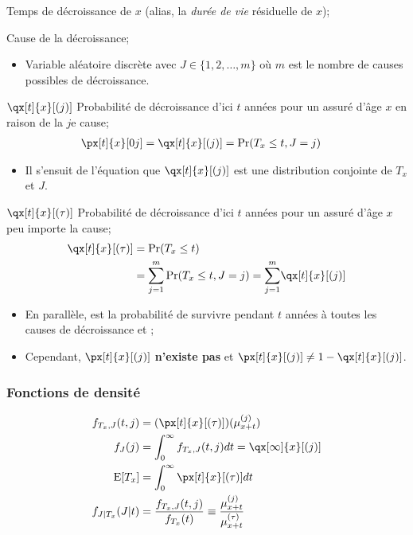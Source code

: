 \documentclass[10pt, french]{article}
\begin{document}
\begin{multicols*}{2}
\begin{description}
	\item[$T_{x}$]	Temps de décroissance de $x$ (alias, la \textit{durée de vie} résiduelle de $x$);
	\item[$J$]	Cause de la décroissance;
		\begin{itemize}[leftmargin = *]
		\item	Variable aléatoire discrète avec $J \in \{1, 2, \dots, m\}$ où $m$ est le nombre de causes possibles de décroissance.
		\end{itemize}
	\item	$\qx[t]{x}[(j)]$	Probabilité de décroissance d'ici $t$ années pour un assuré d'âge $x$ en raison de la $j$e cause;
		\begin{align*}
		\px[t]{x}[0j]
		&=	\qx[t]{x}[(j)]
		=	\Pr(T_{x} \leq t, J = j)
		\end{align*}
		\begin{itemize}[leftmargin = *]
		\item	Il s'ensuit de l'équation que $\qx[t]{x}[(j)]$ est une distribution conjointe de $T_{x}$ et $J$.
		\end{itemize}
	\item	$\qx[t]{x}[(\tau)]$	Probabilité de décroissance d'ici $t$ années pour un assuré d'âge $x$ peu importe la cause;
		\begin{align*}
		\qx[t]{x}[(\tau)]
		&=	\Pr(T_{x} \leq t)		\\
		&=	\sumz{m}{j = 1} \Pr(T_{x} \leq t, J = j)	
		=	\sumz{m}{j = 1} \qx[t]{x}[(j)]	
		\end{align*}
		\begin{itemize}[leftmargin = *]
		\item	En parallèle,  est la probabilité de survivre pendant $t$ années à toutes les causes de décroissance et ;	
		\item	Cependant, $\px[t]{x}[(j)]$ \textbf{n'existe pas} et $\px[t]{x}[(j)] \neq 1 - \qx[t]{x}[(j)]$.
		\end{itemize}
\end{description}

\subsubsection*{Fonctions de densité}
\begin{align*}
	f_{T_{x}, J}(t, j)
	&=	(\px[t]{x}[(\tau)])(\mu_{x + t}^{(j)})	\\
	f_{J}(j)
	&=	\int_{0}^{\infty} f_{T_{x}, J}(t, j) dt	
	=	\qx[\infty]{x}[(j)]	\\
	\text{E}[T_{x}]
	&=	\int_{0}^{\infty} \px[t]{x}[(\tau)]dt	\\
	f_{J | T_{x}}(J | t)
	&=	\frac{f_{T_{x}, J}(t, j)}{f_{T_{x}}(t)}
	\equiv	\frac{\mu_{x +  t}^{(j)}}{\mu_{x +  t}^{(\tau)}}
\end{align*}


\end{multicols*}
\end{document}
